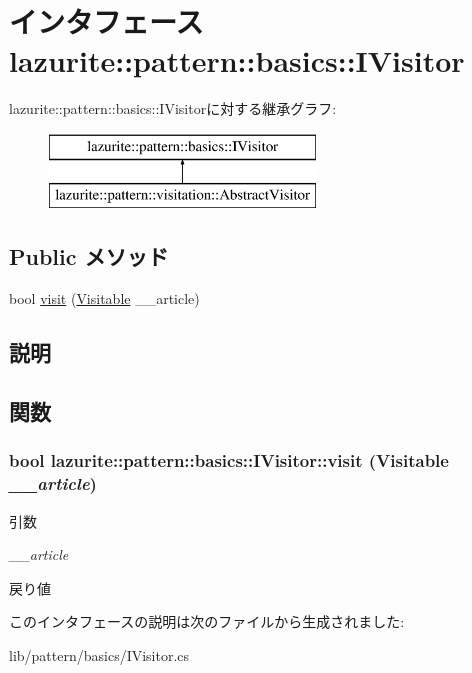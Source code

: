 \hypertarget{interfacelazurite_1_1pattern_1_1basics_1_1_i_visitor}{
\section{インタフェース lazurite::pattern::basics::IVisitor}
\label{interfacelazurite_1_1pattern_1_1basics_1_1_i_visitor}
}
lazurite::pattern::basics::IVisitorに対する継承グラフ:\begin{figure}[H]
\begin{center}
\leavevmode
\includegraphics[height=2cm]{interfacelazurite_1_1pattern_1_1basics_1_1_i_visitor}
\end{center}
\end{figure}
\subsection*{Public メソッド}
\begin{DoxyCompactItemize}
\item 
bool \hyperlink{interfacelazurite_1_1pattern_1_1basics_1_1_i_visitor_a49183743f1b2f27f6ca8a75118dadbda}{visit} (\hyperlink{interfacelazurite_1_1pattern_1_1basics_1_1_visitable}{Visitable} \_\-\_\-article)
\end{DoxyCompactItemize}


\subsection{説明}


\subsection{関数}
\hypertarget{interfacelazurite_1_1pattern_1_1basics_1_1_i_visitor_a49183743f1b2f27f6ca8a75118dadbda}{
\subsubsection[{visit}]{\setlength{\rightskip}{0pt plus 5cm}bool lazurite::pattern::basics::IVisitor::visit ({\bf Visitable} {\em \_\-\_\-article})}}
\label{interfacelazurite_1_1pattern_1_1basics_1_1_i_visitor_a49183743f1b2f27f6ca8a75118dadbda}

\begin{DoxyParams}{引数}
\item[{\em \_\-\_\-article}]\end{DoxyParams}
\begin{DoxyReturn}{戻り値}

\end{DoxyReturn}


このインタフェースの説明は次のファイルから生成されました:\begin{DoxyCompactItemize}
\item 
lib/pattern/basics/IVisitor.cs\end{DoxyCompactItemize}
